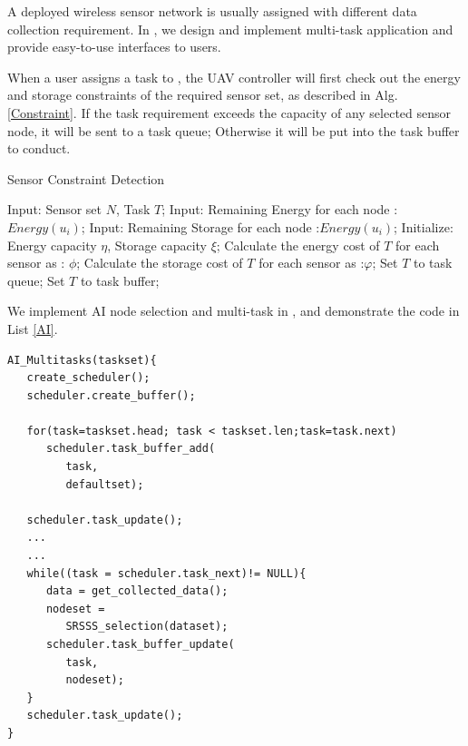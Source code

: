 A deployed wireless sensor network is usually assigned  with
different data collection requirement. In {\sdn}, we design and 
implement multi-task application and provide easy-to-use
interfaces to users.

When a user assigns a task to {\sdn}, the UAV controller will first check out 
the energy and storage constraints of the required sensor set, as described in Alg. \ref{Constraint}. 
If the task requirement exceeds the capacity of any selected sensor node, it will be sent to a     
task queue; Otherwise it will be put into the task buffer to conduct.


\begin{algorithm}
\caption{Sensor Constraint Detection}
\label{Constraint}
\begin{algorithmic}[1]
\STATE Input: Sensor set $N$, Task $T$;
\STATE Input: Remaining Energy for each node :$Energy(u_i)$;
\STATE Input: Remaining Storage for each node :$Energy(u_i)$;
\STATE Initialize: Energy capacity $\eta$, Storage capacity $\xi$;
\STATE Calculate the energy cost of $T$ for each sensor as : $\phi$;
\STATE Calculate the storage cost of $T$ for each sensor as :$\varphi$;
   	 \STATE Set $T$ to task queue;
   	 \ENDIF
\ENDFOR
\STATE Set $T$ to task buffer;
\end{algorithmic}
\end{algorithm}
We implement AI node selection and multi-task in {\sdn}, and demonstrate the code in List \ref{AI}.


\begin{lstlisting}[language={[ANSI]C},label=AI,
	caption={An example of AI selection and Muti-tasks},
	keywordstyle=\color{blue!70},
	showstringspaces=false,
	commentstyle=\color{red!50!green!80!blue!70},
	frame=single,captionpos=t,
	rulesepcolor=\color{red!20!green!20!blue!20},
	basicstyle=\ttfamily]
AI_Multitasks(taskset){
   create_scheduler();
   scheduler.create_buffer();

   for(task=taskset.head; task < taskset.len;task=task.next)
      scheduler.task_buffer_add(
         task,
         defaultset);

   scheduler.task_update();
   ...
   ...
   while((task = scheduler.task_next)!= NULL){
      data = get_collected_data();
      nodeset =
         SRSSS_selection(dataset);
      scheduler.task_buffer_update(
         task,
         nodeset);
   }
   scheduler.task_update();
}

\end{lstlisting}

